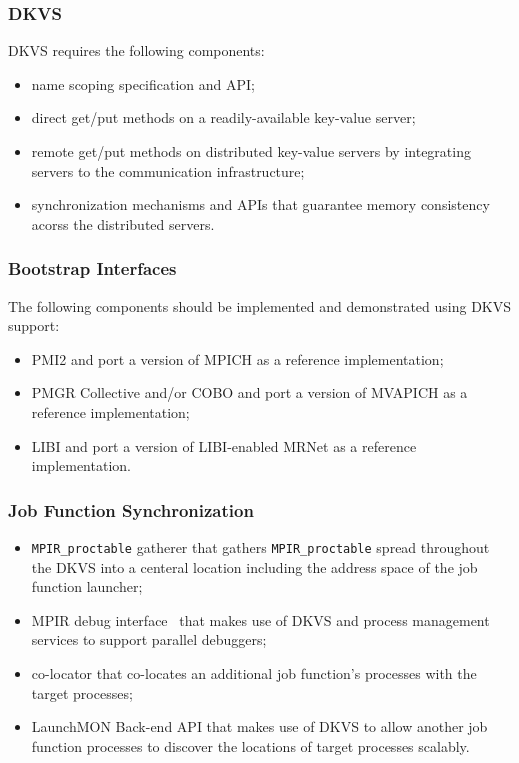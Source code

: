\subsubsection{DKVS}
DKVS requires the following components:
\begin{itemize}
\item{name scoping specification and API;}
\item{direct get/put methods on a readily-available key-value server;}
\item{remote get/put methods on distributed key-value servers by
integrating servers to the communication infrastructure;}
\item{synchronization mechanisms and APIs that guarantee memory consistency
acorss the distributed servers.}
\end{itemize}

\subsubsection{Bootstrap Interfaces}
The following components should be implemented and demonstrated
using DKVS support:
\begin{itemize}
\item{PMI2 and port a version of MPICH as a reference implementation;}
\item{PMGR Collective and/or COBO and port a version of MVAPICH as a reference implementation;}
\item{LIBI and port a version of LIBI-enabled MRNet as a reference implementation.}
\end{itemize}

\subsubsection{Job Function Synchronization}
\begin{itemize}
\item{{\tt MPIR\_proctable} gatherer that gathers {\tt MPIR\_proctable} spread throughout the
DKVS into a centeral location including the address space of the job function launcher;}
\item{MPIR debug interface~\cite{MPIRInterface} that makes use of DKVS and process
management services to support parallel debuggers;}
\item{co-locator that co-locates an additional job function's processes with
the target processes;}
\item{LaunchMON Back-end API that makes use of DKVS to allow another job function processes
to discover the locations of target processes scalably.}
\end{itemize}

